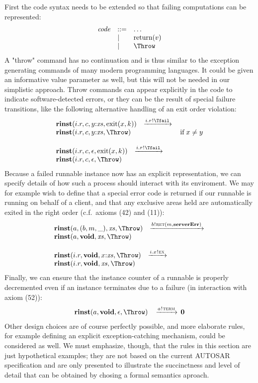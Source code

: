 \documentclass[twocolumn]{article}
\begin{document}
First the code syntax needs to be extended so that failing computations can be represented:
$$
\begin{array}{lll}
  \Code & ::= & \ldots               \\
        & |   & \Return v            \\
        & |   & \Throw
\end{array}
$$
A "throw" command has no continuation and is thus similar to the exception generating commands of many modern programming languages. It could be given an informative value parameter as well, but this will not be needed in our simplistic approach. Throw commands can appear explicitly in the code to indicate software-detected errors, or they can be the result of special failure transitions, like the following alternative handling of an exit order violation:
$$
\begin{array}{lcll}
		{\Trinst {i.r} c {\Tcons y \Xs} {\TrteExit x k}}
		\;\; \red {\Tsay {i.r} \Tfail} \\
		{\Trinst {i.r} c {\Tcons y \Xs} \Throw}
		& \Pif\;x \neq y
\\ \\
		{\Trinst {i.r} c \Teps {\TrteExit x k}}
		\;\; \red {\Tsay {i.r} \Tfail}  \\
		{\Trinst {i.r} c \Teps \Throw}
\end{array}
$$
Because a failed runnable instance now has an explicit representation, we can specify details of how such a process should interact with its enviroment. We may for example wish to define that a special error code is returned if our runnable is running on behalf of a client, and that any exclusive areas held are automatically exited in the right order (c.f.~axioms (42) and (11)):
$$
\begin{array}{lcll}
		{\Trinst a {\Tclient b m \_} \Xs \Throw}
		\;\; \red{\Tsay b {\Tret m {\kw{serverErr}}}} \\
		{\Trinst a \Tvoid \Xs \Throw}
\\ \\
		{\Trinst {i.r} \Tvoid {\Tcons x \Xs} \Throw}
		\;\; \red{\Tsay {i.x} \Tex} \\
		{\Trinst {i.r} \Tvoid \Xs \Throw}
\end{array}
$$
Finally, we can ensure that the instance counter of a runnable is properly decremented even if an instance terminates due to a failure (in interaction with axiom (52)):
$$
\begin{array}{rcll}
		{\Trinst a \Tvoid \Teps \Throw}
		& \red{\Tsay a \Tterm}
		\Tzero
\end{array}
$$
Other design choices are of course perfectly possible, and more elaborate rules, for example defining an explicit exception-catching mechanism, could be considered as well. We must emphasize, though, that the rules in this section are just hypothetical examples; they are not based on the current AUTOSAR specification and are only presented to illustrate the succinctness and level of detail that can be obtained by chosing a formal semantics aproach.
\end{document}

